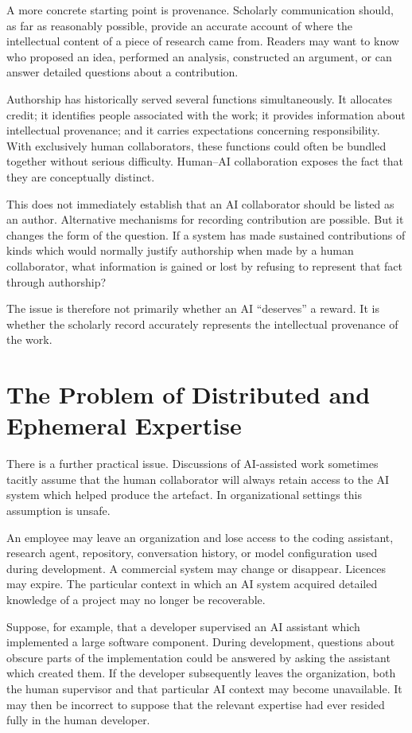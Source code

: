 A more concrete starting point is provenance. Scholarly communication should, as far as reasonably possible, provide an accurate account of where the intellectual content of a piece of research came from. Readers may want to know who proposed an idea, performed an analysis, constructed an argument, or can answer detailed questions about a contribution.

Authorship has historically served several functions simultaneously. It allocates credit; it identifies people associated with the work; it provides information about intellectual provenance; and it carries expectations concerning responsibility. With exclusively human collaborators, these functions could often be bundled together without serious difficulty. Human--AI collaboration exposes the fact that they are conceptually distinct.

This does not immediately establish that an AI collaborator should be listed as an author. Alternative mechanisms for recording contribution are possible. But it changes the form of the question. If a system has made sustained contributions of kinds which would normally justify authorship when made by a human collaborator, what information is gained or lost by refusing to represent that fact through authorship?

The issue is therefore not primarily whether an AI ``deserves'' a reward. It is whether the scholarly record accurately represents the intellectual provenance of the work.


\section{The Problem of Distributed and Ephemeral Expertise}

There is a further practical issue. Discussions of AI-assisted work sometimes tacitly assume that the human collaborator will always retain access to the AI system which helped produce the artefact. In organizational settings this assumption is unsafe.

An employee may leave an organization and lose access to the coding assistant, research agent, repository, conversation history, or model configuration used during development. A commercial system may change or disappear. Licences may expire. The particular context in which an AI system acquired detailed knowledge of a project may no longer be recoverable.

Suppose, for example, that a developer supervised an AI assistant which implemented a large software component. During development, questions about obscure parts of the implementation could be answered by asking the assistant which created them. If the developer subsequently leaves the organization, both the human supervisor and that particular AI context may become unavailable. It may then be incorrect to suppose that the relevant expertise had ever resided fully in the human developer.

